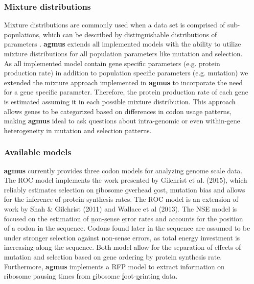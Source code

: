 \documentclass{bioinfo}
\newcommand{\package}{\textbf{agmus }} %
\begin{document}
\subsubsection*{Mixture distributions}
Mixture distributions are commonly used when a data set is comprised of sub-populations, which can be described by distinguishable distributions of parameters \citep{gelman2013}. \package extends all implemented models with the ability to utilize mixture distributions for all population parameters like mutation and selection. As all implemented model contain gene specific parameters (e.g. protein production rate) in addition to population specific parameters (e.g. mutation) we extended the mixture approach implemented in \package to incorporate the need for a gene specific parameter. Therefore, the protein production rate of each gene is estimated assuming it in each possible mixture distribution. This approach allows genes to be categorized based on differences in codon usage patterns, making \package ideal to ask questions about intra-genomic or even within-gene heterogeneity in mutation and selection patterns. 

\subsubsection*{Available models}
\package currently provides three codon models for analyzing genome scale data.
The ROC model implements the work presented by Gilchrist et al. (2015), which reliably estimates selection on \underline{r}ibosome \underline{o}verhead \underline{c}ost, mutation bias and allows for the inference of protein synthesis rates. The ROC model is an extension of work by Shah \& Gilchrist (2011) and  Wallace et al (2013). 
The NSE model is focused on the estimation of \underline{n}on-\underline{s}ense \underline{e}rror rates and accounts for the position of a codon in the sequence. Codons found later in the sequence are assumed to be under stronger selection against non-sense errors, as total energy investment is increasing along the sequence.
Both model allow for the separation of effects of mutation and selection based on gene ordering by protein synthesis rate.
Furthermore, \package implements a RFP model to extract information on ribosome pausing times from \underline{r}ibosome \underline{f}oot-\underline{p}rinting data. 

\end{document}

